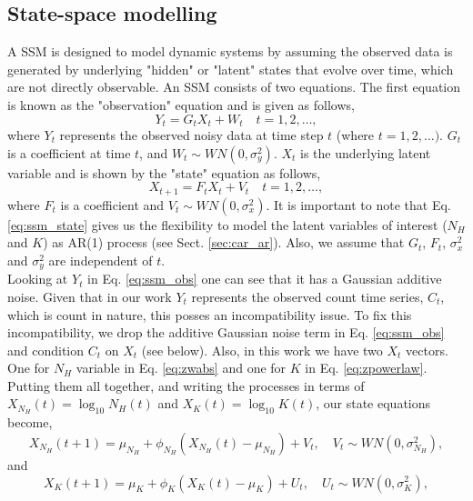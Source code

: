 \documentclass{aa}
\begin{document}
\subsection{State-space modelling}
\label{sec:ssm}
A SSM is designed to model dynamic systems by assuming the observed data is generated by underlying "hidden" or "latent" states that evolve over time, which are not directly observable. An SSM consists of two equations. The first equation is known as the "observation" equation and is given as follows,
\begin{equation}
Y_t = G_tX_t + W_t \quad t = 1,2,\ldots,
\label{eq:ssm_obs}
\end{equation}
where $Y_t$ represents the observed noisy data at time step $t$ (where $t = 1, 2, \ldots)$. $G_t$ is a coefficient at time $t$, and $W_t \sim WN(0, \sigma_y^2)$. $X_t$ is the underlying latent variable and is shown by the "state" equation as follows,
\begin{equation}
X_{t+1} = F_tX_t + V_t \quad t = 1,2,\ldots,
\label{eq:ssm_state}
\end{equation}
where $F_t$ is a coefficient and $V_t \sim WN(0, \sigma_x^2)$. It is important to note that Eq. \ref{eq:ssm_state} gives us the flexibility to model the latent variables of interest ($N_H$ and $K$) as AR(1) process (see Sect. \ref{sec:car_ar}). Also, we assume that $G_t$, $F_t$, $\sigma_x^2$ and $\sigma_y^2$ are independent of $t$. \\
Looking at $Y_t$ in Eq. \ref{eq:ssm_obs} one can see that it has a Gaussian additive noise. Given that in our work $Y_t$ represents the observed count time series, $C_t$, which is count in nature, this posses an incompatibility issue. To fix this incompatibility, we drop the additive Gaussian noise term in Eq. \ref{eq:ssm_obs} and condition $C_t$ on $X_t$ (see below). Also, in this work we have two $X_t$ vectors. One for $N_H$ variable in Eq. \ref{eq:zwabs} and one for $K$ in Eq. \ref{eq:zpowerlaw}. Putting them all together, and writing the processes in terms of
$X_{N_H}(t) = \log_{10} N_H(t)$ and $X_K(t) = \log_{10} K(t)$, our state
equations become,
\begin{equation}
X_{N_H}(t+1) = \mu_{N_H} + \phi_{N_H}\left(X_{N_H}(t) - \mu_{N_H}\right) + V_t,
\quad V_t \sim WN(0, \sigma_{N_H}^2),
\label{eq:ssm_NH}
\end{equation}
and
\begin{equation}
X_K(t+1) = \mu_K + \phi_K\left(X_K(t) - \mu_K\right) + U_t,
\quad U_t \sim WN(0, \sigma_K^2),
\label{eq:ssm_k}
\end{equation}
\end{document}
